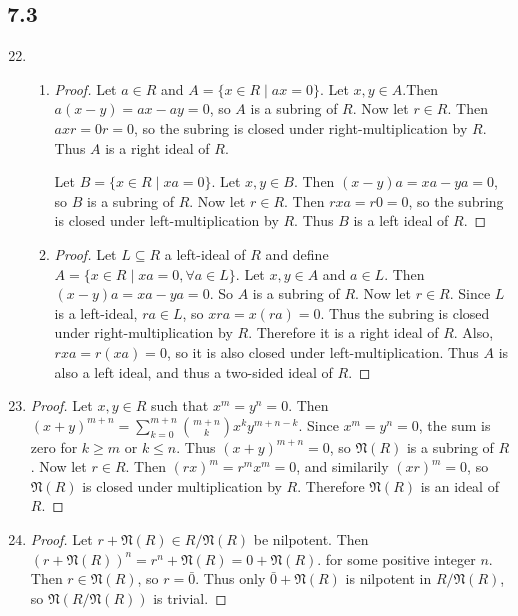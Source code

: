 \documentclass[11pt, letterpaper]{article}
\begin{document}
\thispagestyle{firststyle}


\subsection*{7.3}

\begin{enumerate}
  \setcounter{enumi}{21}
  \item \begin{enumerate}
    \item \begin{proof}
      Let $a \in R$ and $A = \lbrace x \in R \mid ax = 0 \rbrace$. Let $x, y \in A$.Then $a(x - y) = ax - ay = 0$, so $A$ is a subring of $R$. Now let $r \in R$. Then $axr = 0r = 0$, so the subring is closed under right-multiplication by $R$. Thus $A$ is a right ideal of $R$.

      Let $B = \lbrace x \in R \mid xa = 0 \rbrace$. Let $x, y \in B$. Then $(x - y)a = xa - ya = 0$, so $B$ is a subring of $R$. Now let $r \in R$. Then $rxa = r0 = 0$, so the subring is closed under left-multiplication by $R$. Thus $B$ is a left ideal of $R$.
    \end{proof}

    \item \begin{proof}
      Let $L \subseteq R$ a left-ideal of $R$ and define $A = \lbrace x \in R \mid xa = 0, \forall a \in L \rbrace$. Let $x, y \in A$ and $a \in L$. Then $(x - y)a = xa - ya = 0$. So $A$ is a subring of $R$. Now let $r \in R$. Since $L$ is a left-ideal, $ra \in L$, so $xra = x(ra) = 0$. Thus the subring is closed under right-multiplication by $R$. Therefore it is a right ideal of $R$. Also, $rxa = r(xa) = 0$, so it is also closed under left-multiplication. Thus $A$ is also a left ideal, and thus a two-sided ideal of $R$.
    \end{proof}
  \end{enumerate}
  \setcounter{enumi}{28}
  \item \begin{proof}
    Let $x, y \in R$ such that $x^m = y^n = 0$. Then $(x + y)^{m+n} = \sum_{k=0}^{m+n} \binom{m+n}{k} x^k y^{m+n-k}$. Since $x^m = y^n = 0$, the sum is zero for $k \geq m$ or $k \leq n$. Thus $(x + y)^{m+n} = 0$, so $\mathfrak N(R)$ is a subring of $R$. Now let $r \in R$. Then $(rx)^m = r^m x^m = 0$, and similarily $(xr)^m = 0$, so $\mathfrak N(R)$ is closed under multiplication by $R$. Therefore $\mathfrak N(R)$ is an ideal of $R$.
  \end{proof}
  
  \item \begin{proof}
    Let $r + \mathfrak N(R) \in R/\mathfrak N(R)$ be nilpotent. Then $(r + \mathfrak N(R))^n = r^n + \mathfrak N(R) = 0 + \mathfrak N(R)$. for some positive integer $n$. Then $r \in \mathfrak N(R)$, so $r = \bar 0$. Thus only $\bar 0 + \mathfrak N(R)$ is nilpotent in $R/\mathfrak N(R)$, so $\mathfrak N(R/\mathfrak N(R))$ is trivial.
  \end{proof}
\end{enumerate}
\end{document}
